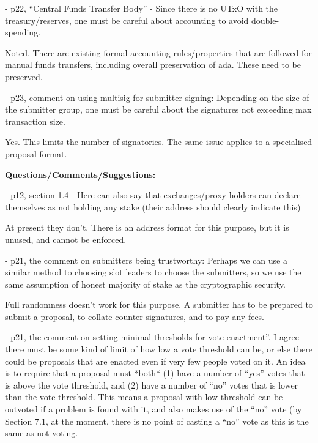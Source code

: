 \documentclass{article}
\begin{document}
\vspace{12pt}
- p22, ``Central Funds Transfer Body'' - Since there is no UTxO with the treasury/reserves, 
one must be careful about accounting to avoid double-spending. 

\vspace{12pt}
{\color{color02} Noted.  There are existing formal accounting rules/properties 
that are followed for manual funds transfers, including overall preservation of 
ada.  These need to be preserved.}

\vspace{12pt}
- p23, comment on using multisig for submitter signing: Depending on the size of 
the submitter group, one must be careful about the signatures not exceeding max 
transaction size.

\vspace{12pt}
{\color{color02} Yes.  This limits the number of signatories.  The same issue applies 
to a specialised proposal format.}

\vspace{24pt}
\begin{center}
\textbf{Questions/Comments/Suggestions:}
\end{center}

\vspace{12pt}
\baselineskip=12pt
\leftskip=0pt
- p12, section 1.4 - Here can also say that exchanges/proxy holders can declare 
themselves as not holding any stake (their address should clearly indicate this)

\vspace{12pt}
{\color{color02} At present they don't.  There is an address format for this purpose, 
but it is unused, and cannot be enforced.}

\vspace{12pt}
- p21, the comment on submitters being trustworthy: Perhaps we can use a similar 
method to choosing slot leaders to choose the submitters, so we use the same assumption 
of honest majority of stake as the cryptographic security.

\vspace{12pt}
{\color{color02} Full randomness doesn't work for this purpose.  A submitter has 
to be prepared to submit a proposal, to collate counter-signatures, and to pay 
any fees.}

\vspace{12pt}
- p21, the comment on setting minimal thresholds for vote enactment''. I agree 
there must be some kind of limit of how low a vote threshold can be, or else there 
could be proposals that are enacted even if very few people voted on it. An idea 
is to require that a proposal must *both* (1) have a number of ``yes'' votes that 
is above the vote threshold, and (2) have a number of ``no'' votes that is lower 
than the vote threshold. This means a proposal with low threshold can be outvoted 
if a problem is found with it, and also makes use of the ``no'' vote (by Section 
7.1, at the moment, there is no point of casting a ``no'' vote as this is the same 
as not voting.
\end{document}
